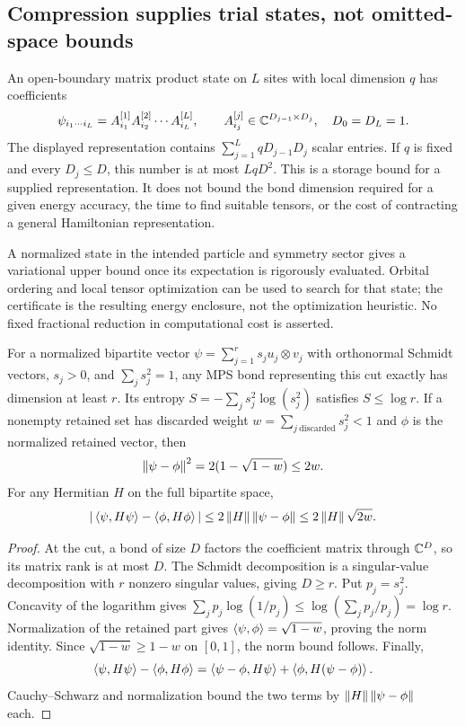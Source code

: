 \subsection{Compression supplies trial states, not omitted-space bounds}
An open-boundary matrix product state on $L$ sites with local dimension $q$
has coefficients
\[
 \psi_{i_1\cdots i_L}
 =A^{[1]}_{i_1}A^{[2]}_{i_2}\cdots A^{[L]}_{i_L},
 \qquad A^{[j]}_{i_j}\in\mathbb{C}^{D_{j-1}\times D_j},\quad D_0=D_L=1.
\]
The displayed representation contains
$\sum_{j=1}^L qD_{j-1}D_j$ scalar entries. If $q$ is fixed and every
$D_j\le D$, this number is at most $LqD^2$. This is a storage bound
for a supplied representation. It does not bound the bond dimension required
for a given energy accuracy, the time to find suitable tensors, or the cost
of contracting a general Hamiltonian representation.

A normalized state in the intended particle and symmetry sector gives a
variational upper bound once its expectation is rigorously evaluated. Orbital
ordering and local tensor optimization can be used to search for that state;
the certificate is the resulting energy enclosure, not the optimization
heuristic. No fixed fractional reduction in computational cost is asserted.

\begin{lemma}
\label{lem:schmidt}
For a normalized bipartite vector
$\psi=\sum_{j=1}^r s_j u_j\otimes v_j$ with orthonormal Schmidt vectors,
$s_j>0$, and $\sum_j s_j^2=1$, any MPS bond representing this cut exactly
has dimension at least $r$. Its entropy
$S=-\sum_j s_j^2\log(s_j^2)$ satisfies $S\le\log r$.
If a nonempty retained set has discarded weight
$w=\sum_{j\ \mathrm{discarded}}s_j^2<1$ and $\phi$ is the normalized
retained vector, then
\[
 \left\lVert \psi-\phi\right\rVert^2=2(1-\sqrt{1-w})\le2w.
\]
For any Hermitian $H$ on the full bipartite space,
\[
 |\left\langle \psi,H\psi\right\rangle-\left\langle \phi,H\phi\right\rangle|
 \le2\left\lVert H\right\rVert\left\lVert \psi-\phi\right\rVert\le2\left\lVert H\right\rVert\sqrt{2w}.
\]
\end{lemma}
\begin{proof}
At the cut, a bond of size $D$ factors the coefficient matrix through
$\mathbb{C}^D$, so its matrix rank is at most $D$. The Schmidt decomposition is a
singular-value decomposition with $r$ nonzero singular values, giving
$D\ge r$. Put $p_j=s_j^2$. Concavity of the logarithm gives
$\sum_j p_j\log(1/p_j)\le\log(\sum_j p_j/p_j)=\log r$.
Normalization of the retained part gives
$\left\langle \psi,\phi\right\rangle=\sqrt{1-w}$, proving the norm identity. Since
$\sqrt{1-w}\ge1-w$ on $[0,1]$, the norm bound follows. Finally,
\[
 \left\langle \psi,H\psi\right\rangle-\left\langle \phi,H\phi\right\rangle
 =\left\langle \psi-\phi,H\psi\right\rangle+\left\langle \phi,H(\psi-\phi)\right\rangle.
\]
Cauchy--Schwarz and normalization bound the two terms by
$\left\lVert H\right\rVert\left\lVert \psi-\phi\right\rVert$ each.
\end{proof}

